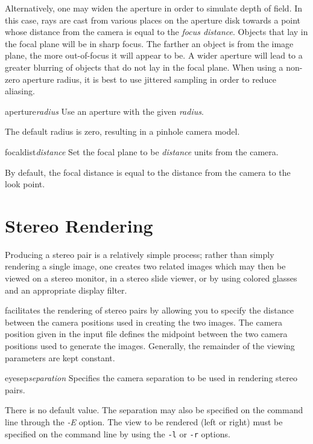 Alternatively, one may widen the aperture in order to
simulate depth of field. In this case, rays are cast from various places on
the aperture disk towards a point whose distance from the
camera is equal to the
{\em focus distance}.  Objects that lay in the focal plane will be
in sharp focus.  The farther an object is from the image plane,
the more out-of-focus it will appear to be.
A wider aperture will lead to a greater blurring of
objects that do not lay in the focal plane.
When using a non-zero aperture radius, it is best to use jittered
sampling in order to reduce aliasing.

\begin{defkey}{aperture}{{\em radius}}
	Use an aperture with the given {\em radius}.
\end{defkey}
The default radius is zero, resulting in a pinhole camera model.

\begin{defkey}{focaldist}{{\em distance}}
	Set the focal plane to be {\em distance} units from the camera.
\end{defkey}
By default, the focal distance is equal to the distance from the
camera to the look point.

\section{Stereo Rendering}

Producing a stereo pair is a relatively simple process; rather than
simply rendering a single image, one creates two related images which
may then be viewed on a stereo monitor, in a stereo slide viewer, or
by using colored glasses and an appropriate display filter.

{\Rayshade} facilitates the rendering of stereo pairs by allowing you
to specify the distance between the camera positions used in
creating the two images.  The camera position given in the
{\rayshade} input file
defines
the midpoint between the two camera positions used to generate the
images.
Generally, the remainder of the viewing parameters are kept constant.

\begin{defkey}{eyesep}{{\em separation}}
	Specifies the camera separation to be used in rendering stereo
	pairs.
\end{defkey}
There is no default value.
The separation may also be specified on the command line through
the {\em -E} option.
The view to be rendered (left or right)
must be specified on the command line by using
the {\tt -l} or {\tt -r} options.

